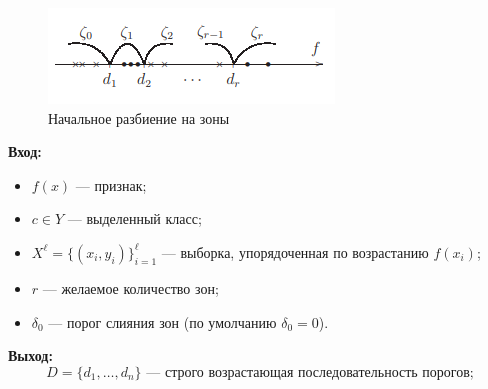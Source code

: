 \begin{figure}
    \centering
    \includegraphics[scale = 1]{images/bin2.png}
    \caption{Начальное разбиение на зоны}
\end{figure}

\newpage
\textbf{Вход:}
\begin{itemize}
    \item $f(x)$ — признак;
    \item $c \in Y$ — выделенный класс;
    \item $X^\ell = \{(x_i, y_i)\}_{i=1}^\ell$ — выборка, упорядоченная по возрастанию $f(x_i)$;
    \item $r$ — желаемое количество зон;
    \item $\delta_0$ — порог слияния зон (по умолчанию $\delta_0 = 0$).
\end{itemize}

\textbf{Выход:}
\[
D = \{d_1, \dots, d_n\} \text{ — строго возрастающая последовательность порогов;}
\]

\hline

